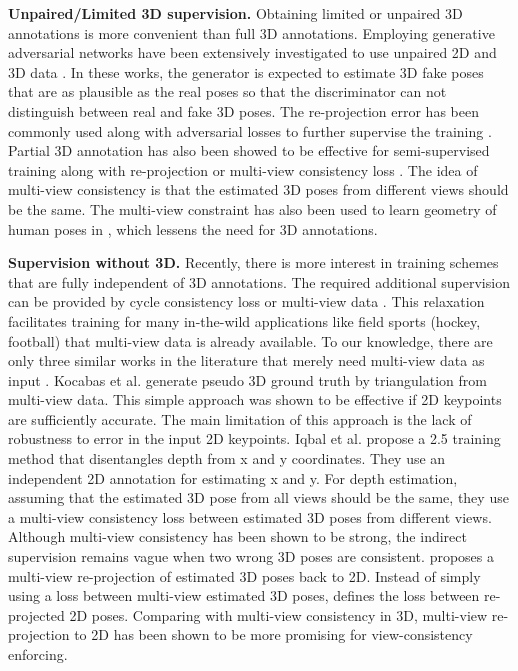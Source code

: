 \documentclass[10pt,twocolumn,letterpaper]{article}
\begin{document}
\textbf{Unpaired/Limited 3D supervision.}
Obtaining limited or unpaired 3D annotations is more convenient than full 3D annotations. Employing generative adversarial networks have been extensively investigated to use unpaired 2D and 3D data \cite{Kanazawa_2018_CVPR, Wandt_2019_CVPR, Yang_2018_CVPR, Kundu_2020_CVPR, Chen_2019_CVPR}. In these works, the generator is expected to estimate 3D fake poses that are as plausible as the real poses so that the discriminator can not distinguish between real and fake 3D poses. The re-projection error has been commonly used along with adversarial losses to further supervise the training \cite{Wandt_2019_CVPR, Kanazawa_2018_CVPR}. Partial 3D annotation has also been showed to be effective for semi-supervised training along with re-projection  \cite{Pavllo_2019_CVPR, Cheng_2019_ICCV} or multi-view consistency loss \cite{Rhodin_2018_CVPR,Mitra_2020_CVPR}. The idea of multi-view consistency is that the estimated 3D poses from different views should be the same. The multi-view constraint has also been used to learn geometry of human poses in \cite{Chen_2019_CVPR, rhodin2018unsupervised}, which lessens the need for 3D annotations. 

\textbf{Supervision without 3D.}
Recently, there is more interest in training schemes that are fully independent of 3D annotations. The required additional supervision can be provided by cycle consistency loss \cite{Drover_2018_ECCV_Workshops,Chen_2019_CVPR} or multi-view data \cite{Iqbal_2020_CVPR, Wandt_2019_CVPR, Kocabas_2019_CVPR}. This relaxation facilitates training for many in-the-wild applications like field sports (hockey, football) \cite{Cai_2019_CVPR_Workshops} that multi-view data is already available. To our knowledge, there are only three similar works in the literature that merely need multi-view data as input \cite{Kocabas_2019_CVPR,Iqbal_2020_CVPR,wandt2020canonpose}. Kocabas et al. \cite{Kocabas_2019_CVPR} generate pseudo 3D ground truth by triangulation from multi-view data. This simple approach was shown to be effective if 2D keypoints are sufficiently accurate. The main limitation of this approach is the lack of robustness to error in the input 2D keypoints. Iqbal et al. \cite{Iqbal_2020_CVPR} propose a 2.5 training method that disentangles depth from x and y coordinates. They use an independent 2D annotation for estimating x and y. For depth estimation, assuming that the estimated 3D pose from all views should be the same, they use a multi-view consistency loss between estimated 3D poses from different views. 
Although multi-view consistency has been shown to be strong, the indirect supervision remains vague when two wrong 3D poses are consistent. \cite{wandt2020canonpose} proposes a multi-view re-projection of estimated 3D poses back to 2D. 
Instead of simply using a loss between multi-view estimated 3D poses, \cite{wandt2020canonpose} defines the loss between re-projected 2D poses. Comparing with multi-view consistency in 3D, multi-view re-projection to 2D has been shown to be more promising for view-consistency enforcing. 
\end{document}
